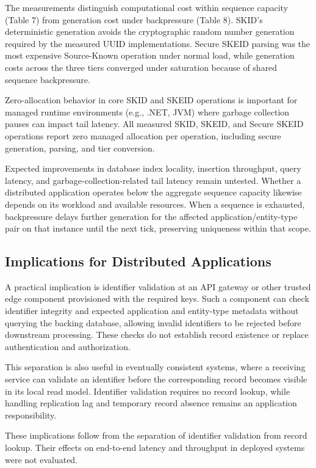 \documentclass[a4paper,fleqn]{cas-sc}
\begin{document}
The measurements distinguish computational cost within sequence capacity
(Table 7) from generation cost under backpressure (Table 8). SKID's
deterministic generation avoids the cryptographic random number
generation required by the measured UUID implementations. Secure SKEID
parsing was the most expensive Source-Known operation under normal load,
while generation costs across the three tiers converged under saturation
because of shared sequence backpressure.

Zero-allocation behavior in core SKID and SKEID operations is important
for managed runtime environments (e.g., .NET, JVM) where garbage
collection pauses can impact tail latency. All measured SKID, SKEID, and
Secure SKEID operations report zero managed allocation per operation,
including secure generation, parsing, and tier conversion.

Expected improvements in database index locality, insertion throughput,
query latency, and garbage-collection-related tail latency remain
untested. Whether a distributed application operates below the aggregate
sequence capacity likewise depends on its workload and available
resources. When a sequence is exhausted, backpressure delays further
generation for the affected application/entity-type pair on that
instance until the next tick, preserving uniqueness within that scope.

\subsection{Implications for Distributed
Applications}\label{implications-for-distributed-applications}

A practical implication is identifier validation at an API gateway or
other trusted edge component provisioned with the required keys. Such a
component can check identifier integrity and expected application and
entity-type metadata without querying the backing database, allowing
invalid identifiers to be rejected before downstream processing. These
checks do not establish record existence or replace authentication and
authorization.

This separation is also useful in eventually consistent systems, where a
receiving service can validate an identifier before the corresponding
record becomes visible in its local read model. Identifier validation
requires no record lookup, while handling replication lag and temporary
record absence remains an application responsibility.

These implications follow from the separation of identifier validation
from record lookup. Their effects on end-to-end latency and throughput
in deployed systems were not evaluated.
\end{document}
